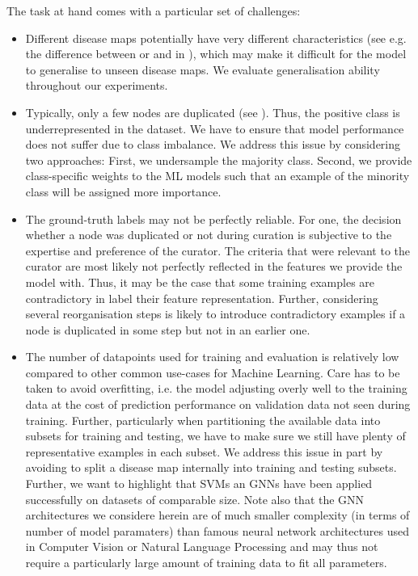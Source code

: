 \documentclass[
	fontsize=10pt, %
	twoside=false, %
	secnumdepth=1, %
  toc=indentunnumbered %
]{kaobook}
\begin{document}
The task at hand comes with a particular set of challenges:
\begin{itemize}
\item Different disease maps potentially have very different characteristics
  (see e.g. the difference between \ADMap or \PDMap and \ReconMap in
  ), which may make it difficult for the model to
  generalise to unseen disease maps. We evaluate generalisation ability
  throughout our experiments.
\item Typically, only a few nodes are duplicated (see ).
  Thus, the positive class is underrepresented in the dataset. We have to ensure that
  model performance does not suffer due to class imbalance. We address this
  issue by considering two approaches: First, we undersample the majority class.
  Second, we provide class-specific weights to the ML models such that an
  example of the minority class will be assigned more importance.
\item The ground-truth labels may not be perfectly reliable.
  For one, the decision whether a node was duplicated or not during curation is
  subjective to the expertise and preference of the curator. The criteria that
  were relevant to the curator are most likely not perfectly reflected in the
  features we provide the model with.
  Thus, it may be the case that some
  training examples are contradictory in label \wrt their feature
  representation. Further, considering several reorganisation steps is likely to
  introduce contradictory examples if a node is duplicated in some step but not
  in an earlier one.
\item The number of datapoints used for training and evaluation is relatively
  low compared to other common use-cases for Machine Learning. Care has to be
  taken to avoid overfitting, i.e. the model adjusting overly well to the training
  data at the cost of prediction performance on validation data not seen during
  training. Further, particularly when partitioning the available data into
  subsets for training and testing, we have to make sure we still have plenty of
  representative examples in each subset. We address this issue in part by avoiding to
  split a disease map internally into training and testing subsets. Further, we
  want to highlight that SVMs an GNNs have been applied successfully on datasets
  of comparable size.
  Note also that the GNN architectures we considere herein are of
  much smaller complexity (in terms of number of model paramaters) than famous
  neural network architectures used in Computer Vision or Natural Language
  Processing
  and may thus not require a particularly large amount of training
  data to fit all parameters.
\end{itemize}
\end{document}
